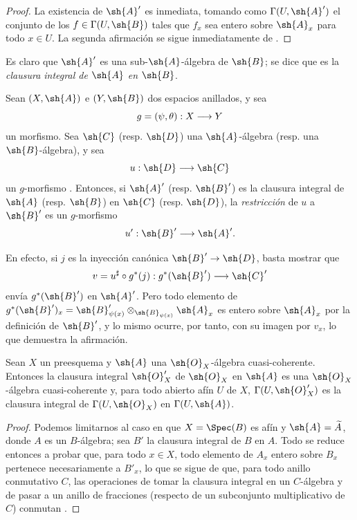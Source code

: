 \documentclass[oneside,10pt]{amsart}
\makeatletter
\newcommand{\ega@arrow}[2]{\mathchoice{#1}{#2}{#2}{#2}}
\renewcommand{\to}{\ega@arrow{\longrightarrow}{\rightarrow}}
\newcommand{\oldpage}[2][]{\marginnote{\normalfont\footnotesize\textbf{#1}~|~#2}\ignorespaces}
\let\EGAOriginalLabel\label
\renewcommand{\label}[1]{\phantomsection\EGAOriginalLabel{#1}}
\makeatother
\begin{document}
\begin{proof}
La existencia de $\sh{A}'$ es inmediata, tomando como $\Gamma(U,\sh{A}')$ el conjunto de los $f\in\Gamma(U,\sh{B})$ tales que $f_x$ sea entero sobre $\sh{A}_x$ para todo $x\in U$.
La segunda afirmación se sigue inmediatamente de .
\end{proof}

Es claro que $\sh{A}'$ es una sub-$\sh{A}$-álgebra de $\sh{B}$;
se dice que es la \emph{clausura integral de $\sh{A}$ en $\sh{B}$}.

\begin{env}[6.3.3]
\label{II.6.3.3}
Sean $(X,\sh{A})$ e $(Y,\sh{B})$ dos espacios anillados, y sea
\[
  g = (\psi,\theta):X\to Y
\]
un morfismo.
Sea $\sh{C}$ (resp. $\sh{D}$) una $\sh{A}$-álgebra (resp. una $\sh{B}$-álgebra), y sea
\[
  u:\sh{D}\to\sh{C}
\]
un $g$-morfismo .
Entonces, si $\sh{A}'$ (resp. $\sh{B}'$) es la clausura integral de $\sh{A}$ (resp. $\sh{B}$) en $\sh{C}$ (resp. $\sh{D}$), la \emph{restricción} de $u$ a $\sh{B}'$ es un $g$-morfismo
\[
  u':\sh{B}'\to\sh{A}'.
\]

En efecto, si $j$ es la inyección canónica $\sh{B}'\to\sh{D}$, basta mostrar que
\[
  v = u^\sharp\circ g^*(j) : g^*(\sh{B}')\to\sh{C}'
\]
envía $g^*(\sh{B}')$ en $\sh{A}'$.
Pero todo elemento de $g^*(\sh{B}')_x=\sh{B}'_{\psi(x)}\otimes_{\sh{B}_{\psi(x)}}\sh{A}_x$ es entero sobre $\sh{A}_x$ por la definición de $\sh{B}'$, y lo mismo ocurre, por tanto, con su imagen por $v_x$, lo que demuestra la afirmación.
\end{env}

\begin{proposition}[6.3.4]
\label{II.6.3.4}
Sean $X$ un preesquema y $\sh{A}$ una $\sh{O}_X$-álgebra cuasi-coherente.
Entonces la clausura integral $\sh{O}'_X$ de $\sh{O}_X$ en $\sh{A}$ es una $\sh{O}_X$-álgebra cuasi-coherente y, para todo abierto afín $U$ de $X$, $\Gamma(U,\sh{O}'_X)$ es la clausura integral de $\Gamma(U,\sh{O}_X)$ en $\Gamma(U,\sh{A})$.
\end{proposition}

\begin{proof}
Podemos limitarnos al caso en que $X=\Spec(B)$ es afín y $\sh{A}=\widetilde{A}$, donde $A$ es un $B$-álgebra;
\oldpage[II]{118}
sea $B'$ la clausura integral de $B$ en $A$.
Todo se reduce entonces a probar que, para todo $x\in X$, todo elemento de $A_x$ entero sobre $B_x$ pertenece necesariamente a $B'_x$, lo que se sigue de que, para todo anillo conmutativo $C$, las operaciones de tomar la clausura integral en un $C$-álgebra y de pasar a un anillo de fracciones (respecto de un subconjunto multiplicativo de $C$) conmutan \cite[t.~I, pp.~261 y 257]{I-13}.
\end{proof}
\end{document}
